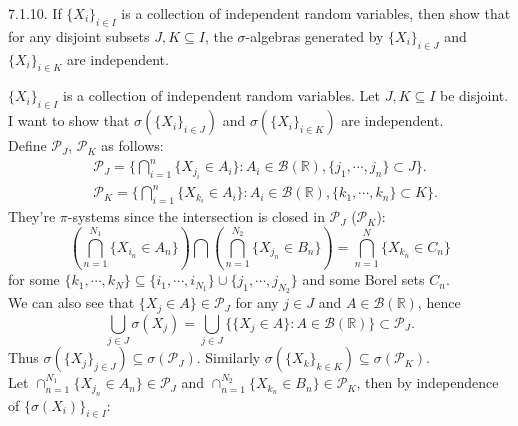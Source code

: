 \begin{exercise}7.1.10. If $\{X_i\}_{i\in I}$ is a collection of independent random variables, then show that for any disjoint subsets $J, K \subseteq I$, the $\sigma$-algebras generated by
$\{X_i\}_{i\in J}$ and $\{X_i\}_{i\in K}$ are independent.
\end{exercise}
\begin{answer}
    $\{X_i\}_{i\in I}$ is a collection of independent random variables. Let $J,K\subseteq I$ be disjoint. I want to show that $\sigma(\{X_i\}_{i\in J})$ and $\sigma(\{X_i\}_{i\in K})$ are independent.\\
    Define $\mathcal{P}_J$, $\mathcal{P}_K$ as follows:
    \begin{equation*}
        \begin{aligned}
                    &\mathcal{P}_J=\Big\{\bigcap_{i=1}^n\{X_{j_i}\in A_i\}:A_i\in\mathcal{B}(\mathbb{R}), \{j_1,\cdots,j_n\}\subset J\Big\}.\\
                    &\mathcal{P}_K=\Big\{\bigcap_{i=1}^n\{X_{k_i}\in A_i\}:A_i\in\mathcal{B}(\mathbb{R}), \{k_1,\cdots,k_n\}\subset K\Big\}.
        \end{aligned}
    \end{equation*}
    They're $\pi$-systems since the intersection is closed in $\mathcal{P}_J$ ($\mathcal{P}_K$):
    \begin{equation*}
        \left(\bigcap_{n=1}^{N_1}\{X_{i_n}\in A_n\}\right)\bigcap\left(\bigcap_{n=1}^{N_2}\{X_{j_n}\in B_n\}\right)=\bigcap_{n=1}^{N}\{X_{k_n}\in C_n\}
    \end{equation*}
    for some $\{k_1,\cdots,k_N\}\subseteq\{i_1,\cdots,i_{N_1}\}\cup\{j_1,\cdots,j_{N_2}\}$ and some Borel sets $C_n$.\\
    We can also see that $\{X_j\in A\}\in\mathcal{P}_J$ for any $j\in J$ and $A\in\mathcal{B}(\mathbb{R})$, hence
    \begin{equation*}
        \bigcup_{j\in J}\sigma(X_j)=\bigcup_{j\in J}\Big\{\{X_j\in A\}:A\in\mathcal{B}(\mathbb{R})\Big\}\subset\mathcal{P}_J.
    \end{equation*}
    Thus $\sigma(\{X_j\}_{j\in J})\subseteq\sigma(\mathcal{P}_J)$. Similarly $\sigma(\{X_k\}_{k\in K})\subseteq\sigma(\mathcal{P}_K)$.\\
    Let $\cap_{n=1}^{N_1}\{X_{j_n}\in A_n\}\in\mathcal{P}_{J}$ and $\cap_{n=1}^{N_2}\{X_{k_n}\in B_n\}\in\mathcal{P}_{K}$, then by independence of $\{\sigma(X_i)\}_{i\in I}$:
    \begin{equation*}
        \begin{aligned}

\end{aligned}
\end{equation*}
\end{answer}
